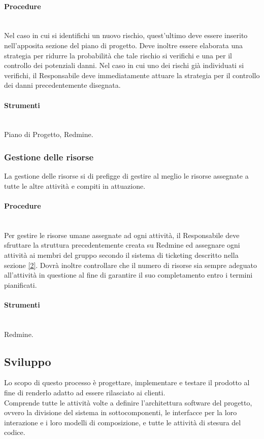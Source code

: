 \paragraph{Procedure} \hfill \\
Nel caso in cui si identifichi un nuovo rischio, quest'ultimo deve essere inserito nell'apposita sezione del piano di progetto. Deve inoltre essere elaborata una strategia per ridurre la probabilità che tale rischio si verifichi e una per il controllo dei potenziali danni.
Nel caso in cui uno dei rischi già individuati si verifichi, il Responsabile deve immediatamente attuare la strategia per il controllo dei danni precedentemente disegnata.

\paragraph{Strumenti} \hfill \\
Piano di Progetto, Redmine.


\subsubsection{Gestione delle risorse}
La gestione delle risorse si di prefigge di gestire al meglio le risorse assegnate a tutte le altre attivit\`{a} e compiti in attuazione.
\paragraph{Procedure} \hfill \\
Per gestire le risorse umane assegnate ad ogni attivit\`{a}, il Responsabile deve sfruttare la struttura precedentemente creata su Redmine ed assegnare ogni attivit\`{a} ai membri del gruppo secondo il sistema di ticketing descritto nella sezione \ref{2}.
Dovrà inoltre controllare che il numero di risorse sia sempre adeguato all'attivit\`{a} in questione al fine di garantire il suo completamento entro i termini pianificati.

\paragraph{Strumenti} \hfill \\
Redmine.


\subsection{Sviluppo}
Lo scopo di questo processo è progettare, implementare e testare il prodotto al fine di renderlo adatto ad essere rilasciato ai clienti.\\
Comprende tutte le attivit\`{a} volte a definire l'architettura software del progetto, ovvero la divisione del sistema in sottocomponenti, le interfacce per la loro interazione e i loro modelli di composizione, e tutte le attivit\`{a} di stesura del codice.

